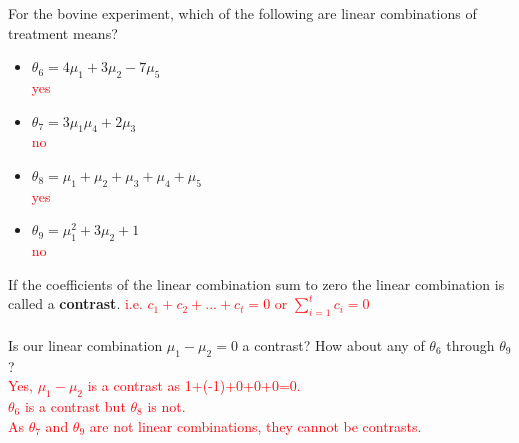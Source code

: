 For the bovine experiment, which of the following are linear combinations of treatment means?
\begin{itemize}
    \item $\theta_6=4\mu_{1}+3\mu_{2}-7\mu_{5}$\\ \textcolor{red}{yes}
    \item $\theta_7=3\mu_{1}\mu_{4}+2\mu_{3}$ \\    \textcolor{red}{no}
    \item $\theta_8=\mu_{1}+\mu_{2}+\mu_{3}+\mu_{4}+\mu_{5}$\\  \textcolor{red}{yes}
    \item $\theta_9=\mu_{1}^2+3\mu_{2}+1$\\   \textcolor{red}{no}
\end{itemize}
If the coefficients of the linear combination sum to zero the linear combination is called a \textbf{contrast}.%
\textcolor{red}{i.e. $c_1+c_2+...+c_t=0$ or $\sum_{i=1}^{t}c_i=0$}\\~\\
Is our linear combination $\mu_1-\mu_2=0$ a contrast?  How about any of $\theta_6$ through $\theta_9$?%
\textcolor{red}{\\ Yes, $\mu_1-\mu_2$ is a contrast as 1+(-1)+0+0+0=0.\\
$\theta_6$ is a contrast but $\theta_8$ is not.  \\
As $\theta_7$ and $\theta_9$ are not linear combinations, they cannot be contrasts.}

\newpage


